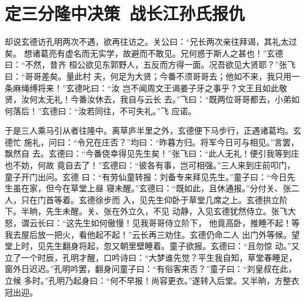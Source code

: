 \chapter{定三分隆中决策~战长江孙氏报仇}

却说玄德访孔明两次不遇，欲再往访之。关公曰：“兄长两次亲往拜谒，其礼太过矣。
想诸葛亮有虚名而无实学，故避而不敢见。兄何惑于斯人之甚也！”玄德曰：“不然，昔齐
桓公欲见东郭野人，五反而方得一面。况吾欲见大贤耶？”张飞曰：“哥哥差矣。量此村
夫，何足为大贤；今番不须哥哥去；他如不来，我只用一条麻绳缚将来！”玄德叱曰：“汝
岂不闻周文王谒姜子牙之事乎？文王且如此敬贤，汝何太无礼！今番汝休去，我自与云长
去。”飞曰：“既两位哥哥都去，小弟如何落后！”玄德曰：“汝若同往，不可失礼。”飞
应诺。

于是三人乘马引从者往隆中。离草庐半里之外，玄德便下马步行，正遇诸葛均。玄德忙
施礼，问曰：“令兄在庄否？”均曰：“昨暮方归。将军今日可与相见。”言罢，飘然自
去。玄德曰：“今番侥幸得见先生矣！”张飞曰：“此人无礼！便引我等到庄也不妨，何故
竟自去了！”玄德曰：“彼各有事，岂可相强。”三人来到庄前叩门，童子开门出问。玄德
曰：“有劳仙童转报：刘备专来拜见先生。”童子曰：“今日先生虽在家，但今在草堂上昼
寝未醒。”玄德曰：“既如此，且休通报。”分付关、张二人，只在门首等着。玄德徐步而
入，见先生仰卧于草堂几席之上。玄德拱立阶下。半晌，先生未醒。关、张在外立久，不见
动静，入见玄德犹然侍立。张飞大怒，谓云长曰：“这先生如何傲慢！见我哥哥侍立阶下，
他竟高卧，推睡不起！等我去屋后放一把火，看他起不起！”云长再三劝住。玄德仍命二人
出门外等候。望堂上时，见先生翻身将起，忽又朝里壁睡着。童子欲报。玄德曰：“且勿惊
动。”又立了一个时辰，孔明才醒，口吟诗曰：“大梦谁先觉？平生我自知，草堂春睡足，
窗外日迟迟。”孔明吟罢，翻身问童子曰：“有俗客来否？”童子曰：“刘皇叔在此，立候
多时。”孔明乃起身曰：“何不早报！尚容更衣。”遂转入后堂。又半晌，方整衣冠出迎。

